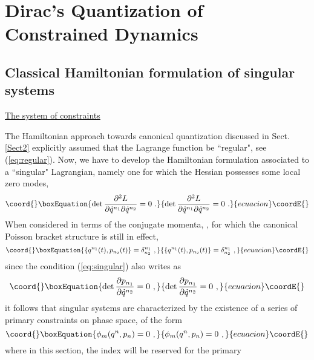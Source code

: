 \documentclass[a4paper,11pt]{article}
\begin{document}
\section{Dirac's Quantization of Constrained Dynamics}
\label{Sect5}

\subsection{Classical Hamiltonian formulation of singular systems}
\label{Subsect5.1}

\noindent\underline{The system of constraints}

\vspace{5pt}

The Hamiltonian approach towards canonical quantization discussed in
Sect.\ref{Sect2} explicitly assumed that the Lagrange function be
``regular", see (\ref{eq:regular}). Now, we have to develop the
Hamiltonian formulation associated to a ``singular" Lagrangian,\cite{Dirac,JG1}
namely one for which the Hessian possesses some local zero modes,
\begin{equation}\coord{}\boxEquation{
{\rm det}\,\frac{\partial^2 L}{\partial\dot{q}^{n_1}\partial\dot{q}^{n_2}}=0\ .
\label{eq:singular}
}{
{\rm det}\,\frac{\partial^2 L}{\partial\dot{q}^{n_1}\partial\dot{q}^{n_2}}=0\ .
}{ecuacion}\coordE{}\end{equation}
When considered in terms of the conjugate momenta, 
\coordHE{}, for which the canonical Poisson bracket
structure is still in effect,
\begin{equation}\coord{}\boxEquation{
\{q^{n_1}(t),p_{n_2}(t)\}=\delta^{n_1}_{n_2}\ ,
}{
\{q^{n_1}(t),p_{n_2}(t)\}=\delta^{n_1}_{n_2}\ ,
}{ecuacion}\coordE{}\end{equation}
since the condition (\ref{eq:singular}) also writes as
\begin{equation}\coord{}\boxEquation{
{\rm det}\,\frac{\partial p_{n_1}}{\partial\dot{q}^{n_2}}=0\ ,
}{
{\rm det}\,\frac{\partial p_{n_1}}{\partial\dot{q}^{n_2}}=0\ ,
}{ecuacion}\coordE{}\end{equation}
it follows that singular systems are characterized by the existence of
a series of primary constraints on phase space, of the form
\begin{equation}\coord{}\boxEquation{
\phi_m(q^n,p_n)=0\ ,
}{
\phi_m(q^n,p_n)=0\ ,
}{ecuacion}\coordE{}\end{equation}
where in this section, the index \coordHE{} will be reserved for the primary
\end{document}
